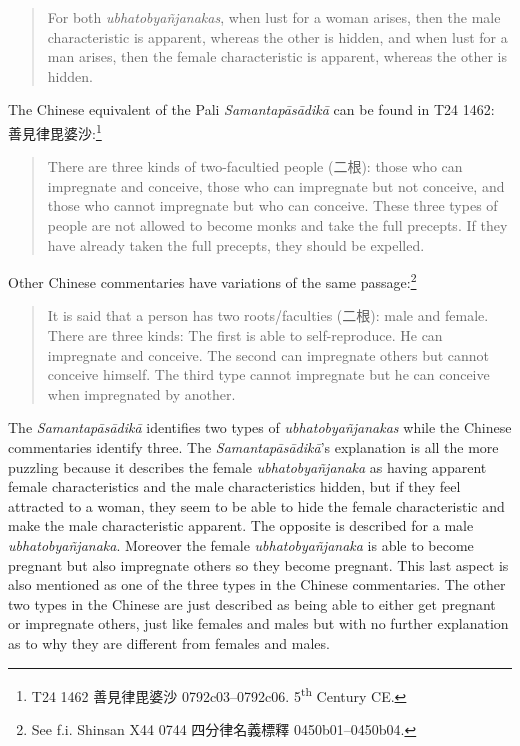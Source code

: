 \begin{quote}
For both \textit{ubhatob­yañ­janakas}, when lust for a woman arises, then the male characteristic is apparent, whereas the other is hidden, and when lust for a man arises, then the female characteristic is apparent, whereas the other is hidden.
\end{quote}

The Chinese equivalent of the Pali \textit{Samantapāsādikā} can be found in T24 1462: 善見律毘婆沙:\footnote{T24 1462 善見律毘婆沙 0792c03–0792c06. 5\textsuperscript{th} Century CE.}
\begin{quote}
There are three kinds of two-facultied people (二根): those who can impregnate and conceive, those who can impregnate but not conceive, and those who cannot impregnate but who can conceive. These three types of people are not allowed to become monks and take the full precepts. If they have already taken the full precepts, they should be expelled.
\end{quote}

Other Chinese commentaries have variations of the same passage:\footnote{See f.i. Shinsan X44 0744 四分律名義標釋 0450b01–0450b04.}
\begin{quote}
It is said that a person has two roots/faculties (二根): male and female. There are three kinds: The first is able to self-reproduce. He can impregnate and conceive. The second can impregnate others but cannot conceive himself. The third type cannot impregnate but he can conceive when impregnated by another. 
\end{quote}

The \textit{Samantapāsādikā} identifies two types of \textit{ubhatob­yañ­janakas} while the Chinese commentaries identify three. The \textit{Samantapāsādikā}'s explanation is all the more puzzling because it describes the female \textit{ubhatob­yañ­janaka} as having apparent female characteristics and the male characteristics hidden, but if they feel attracted to a woman, they seem to be able to hide the female characteristic and make the male characteristic apparent. The opposite is described for a male \textit{ubhatob­yañ­janaka}. Moreover the female \textit{ubhatob­yañ­janaka} is able to become pregnant but also impregnate others so they become pregnant. This last aspect is also mentioned as one of the three types in the Chinese commentaries. The other two types in the Chinese are just described as being able to either get pregnant or impregnate others, just like females and males but with no further explanation as to why they are different from females and males. 

